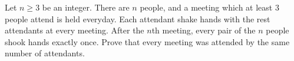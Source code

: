 Let $n \geq 3$ be an integer. There are $n$ people, and a meeting which at least $3$ people attend is held everyday. Each attendant shake hands with the rest attendants at every meeting. After the $n$th meeting, every pair of the $n$ people shook hands exactly once. Prove that every meeting was attended by the same number of attendants.
